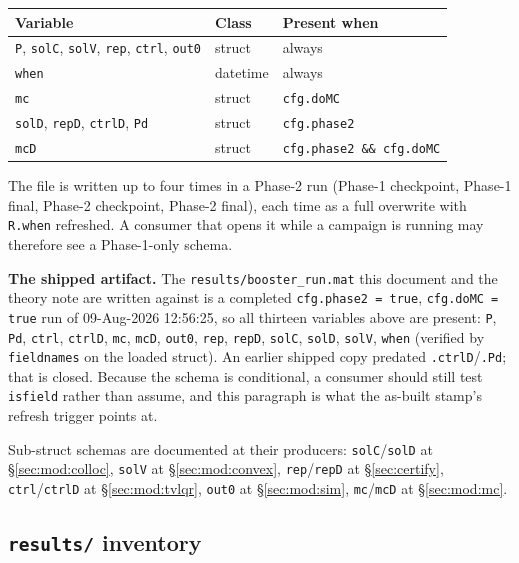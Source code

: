 \documentclass[11pt]{article}
\newcommand{\file}[1]{\texttt{#1}}
\begin{document}
\begin{center}
\begin{tabular}{@{}lll@{}}
\toprule
Variable & Class & Present when \\
\midrule
\texttt{P}, \texttt{solC}, \texttt{solV}, \texttt{rep}, \texttt{ctrl},
  \texttt{out0} & struct & always \\
\texttt{when} & datetime & always \\
\texttt{mc} & struct & \texttt{cfg.doMC} \\
\texttt{solD}, \texttt{repD}, \texttt{ctrlD}, \texttt{Pd} & struct &
  \texttt{cfg.phase2} \\
\texttt{mcD} & struct & \texttt{cfg.phase2 \&\& cfg.doMC} \\
\bottomrule
\end{tabular}
\end{center}

The file is written up to four times in a Phase-2 run (Phase-1 checkpoint,
Phase-1 final, Phase-2 checkpoint, Phase-2 final), each time as a full
overwrite with \texttt{R.when} refreshed. A consumer that opens it while a
campaign is running may therefore see a Phase-1-only schema.

\textbf{The shipped artifact.} The \file{results/booster\_run.mat} this
document and the theory note are written against is a completed
\texttt{cfg.phase2 = true}, \texttt{cfg.doMC = true} run of
09-Aug-2026 12:56:25, so all thirteen variables above are present:
\texttt{P}, \texttt{Pd}, \texttt{ctrl}, \texttt{ctrlD}, \texttt{mc},
\texttt{mcD}, \texttt{out0}, \texttt{rep}, \texttt{repD}, \texttt{solC},
\texttt{solD}, \texttt{solV}, \texttt{when} (verified by
\texttt{fieldnames} on the loaded struct). An earlier shipped copy predated
\texttt{.ctrlD}/\texttt{.Pd}; that is closed. Because the schema is
conditional, a consumer should still test \texttt{isfield} rather than
assume, and this paragraph is what the as-built stamp's refresh trigger
points at.

Sub-struct schemas are documented at their producers:
\texttt{solC}/\texttt{solD} at \S\ref{sec:mod:colloc}, \texttt{solV} at
\S\ref{sec:mod:convex}, \texttt{rep}/\texttt{repD} at \S\ref{sec:certify},
\texttt{ctrl}/\texttt{ctrlD} at \S\ref{sec:mod:tvlqr}, \texttt{out0} at
\S\ref{sec:mod:sim}, \texttt{mc}/\texttt{mcD} at \S\ref{sec:mod:mc}.

\subsection{\file{results/} inventory}
\end{document}
